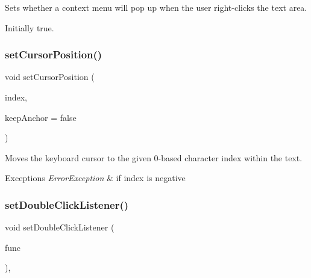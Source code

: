 Sets whether a context menu will pop up when the user right-\/clicks the text area. 

Initially true. \mbox{\label{classsgl_1_1GTextArea_a5817e10a86be5cd41b3668d8fccb10e0}} 
\subsubsection{\texorpdfstring{set\+Cursor\+Position()}{setCursorPosition()}}
{\footnotesize\ttfamily void set\+Cursor\+Position (\begin{DoxyParamCaption}\item[{int}]{index,  }\item[{bool}]{keep\+Anchor = {\ttfamily false} }\end{DoxyParamCaption})\hspace{0.3cm}{\ttfamily [virtual]}}



Moves the keyboard cursor to the given 0-\/based character index within the text. 


\begin{DoxyExceptions}{Exceptions}
{\em Error\+Exception} & if index is negative \\
\hline
\end{DoxyExceptions}
\mbox{\label{classsgl_1_1GInteractor_ac29f9a3462458e165fae3a1f046ee77a}} 
\subsubsection{\texorpdfstring{set\+Double\+Click\+Listener()}{setDoubleClickListener()}\hspace{0.1cm}{\footnotesize\ttfamily [1/2]}}
{\footnotesize\ttfamily void set\+Double\+Click\+Listener (\begin{DoxyParamCaption}\item[{\mbox{\hyperlink{namespacesgl_ae9f3e9eab70035da1a2b114e21357b25}{G\+Event\+Listener}}}]{func }\end{DoxyParamCaption})\hspace{0.3cm}{\ttfamily [virtual]}, {\ttfamily [inherited]}}



